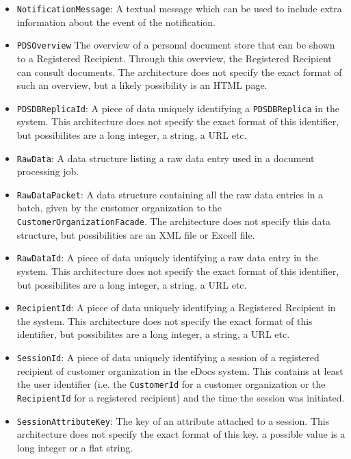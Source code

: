 \documentclass[a4paper,10pt]{article}
\begin{document}
\begin{itemize}
    \item \texttt{NotificationMessage}: A textual message which can be used to include extra information about the event of the notification.
    
	\item \texttt{PDSOverview} The overview of a personal document store that can be shown to a Registered Recipient. Through this overview, the Registered Recipient can consult documents. The architecture does not specify the exact format of such an overview, but a likely possibility is an HTML page.
    
    \item \texttt{PDSDBReplicaId}:  A piece of data uniquely identifying a \texttt{PDSDBReplica} in the system. This architecture does not specify the exact format of this identifier, but possibilites are a long integer, a string, a URL etc.
    
    \item \texttt{RawData}: A data structure listing a raw data entry used in a document processing job.
    
    \item \texttt{RawDataPacket}: A data structure containing all the raw data entries in a batch, given by the customer organization to the \texttt{CustomerOrganizationFacade}. The architecture does not specify this data structure, but possibilities are an XML file or Excell file.
    
    \item \texttt{RawDataId}: A piece of data uniquely identifying a raw data entry in the system. This architecture does not specify the exact format of this identifier, but possibilites are a long integer, a string, a URL etc.
    
    \item \texttt{RecipientId}: A piece of data uniquely identifying a Registered Recipient in the system. This architecture does not specify the exact format of this identifier, but possibilites are a long integer, a string, a URL etc.
    
    \item \texttt{SessionId}: A piece of data uniquely identifying a session of a registered recipient of customer organization in the eDocs system. This contains at least the user identifier (i.e. the \texttt{CustomerId} for a customer organization or the \texttt{RecipientId} for a registered recipient) and the time the session was initiated.
    
    \item \texttt{SessionAttributeKey}: The key of an attribute attached to a session. This architecture does not specify the exact format of this key. a possible value is a long integer or a flat string.
    

\end{itemize}
\end{document}
